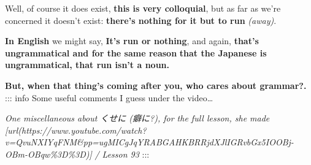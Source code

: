 Well, of course it does exist, {\bf this is very colloquial}, but as far as we're concerned it doesn't exist: {\bf there's nothing for it but to run} {\em (away)}.

\thinrule

{\bf In English} we might say, {\bf It's run or nothing}, and again, {\bf that's ungrammatical and for the same reason} {\bf that the Japanese is ungrammatical, that run isn't a noun.}

{\bf But, when that thing's coming after you, who cares about grammar?.} ::: info Some useful comments I guess under the video\ldots{}

{}

{}

{\em One miscellaneous about くせに (癖に?), for the full lesson, she made [url(https://www.youtube.com/watch?v=QvuNXIYqFNM&pp=ugMICgJqYRABGAHKBRRjdXJlIGRvbGx5IOOBj-OBm-OBqw\%3D\%3D)]} {\em / Lesson 93}{} :::

\stopsectionlevel

\stopsectionlevel
